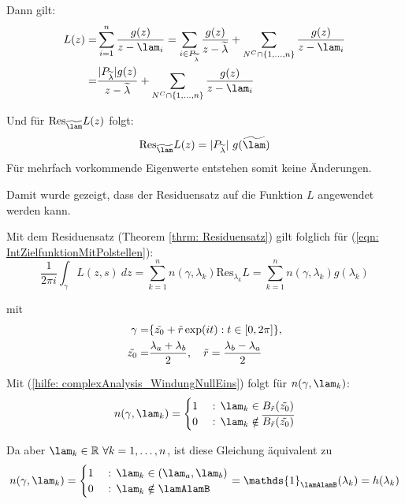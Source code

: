 \documentclass[a4paper,12pt]{report}
\newcommand{\R}{\mathbb R}
\newcommand{\1}{\mathds{1}}
\newcommand{\Res}{\text{Res}}
\theoremstyle{plain} %
\theoremstyle{definition} %
\theoremstyle{remark}
\begin{document}
\begin{itemize}
                        Dann gilt:
                        \begin{align*}
                              L(z) =& \sum_{i=1}^{n} \frac{g(z)}{z-\lam_i}
                              = \sum_{i\in P_{\widetilde \lambda}} \frac{g(z)}{z-\widetilde{\lambda}}+\sum_{N^C\cap\{1,\dots,n\}}\frac{g(z)}{z-\lam_i}\\
                              =& \frac{|P_{\widetilde \lambda}| g(z)}{z-\widetilde{\lambda}}+\sum_{N^C\cap\{1,\dots,n\}}\frac{g(z)}{z-\lam_i}
                        \end{align*}

                        Und für $\Res_{\widetilde{\lam}}L(z)$ folgt:
                        $$\Res_{\widetilde{\lam}}L(z) = |P_{\widetilde \lambda}|\ g(\widetilde{\lam})$$
                        Für mehrfach vorkommende Eigenwerte entstehen somit keine Änderungen. 
            \end{itemize}

            Damit wurde gezeigt, dass der Residuensatz auf die Funktion $L$ angewendet werden kann.

            Mit dem Residuensatz (Theorem \ref{thrm: Residuensatz}) gilt folglich für (\ref{eqn: IntZielfunktionMitPolstellen}):
            $$\frac 1 {2\pi i}\int_\gamma L(z,s)\ dz = \sum_{k=1}^{n} n(\gamma, \lambda_k) \Res_{\lambda_k}L = \sum_{k=1}^{n} n(\gamma, \lambda_k) g(\lambda_k)$$

            mit \begin{align}
                  \gamma =& \{\Tilde{z_0} + \Tilde r\exp(i t): t\in [0,2\pi]\},\label{def: gamma}\\
                  \Tilde{z_0} =& \frac {\lambda_a+\lambda_b} {2},\quad\Tilde r = \frac {\lambda_b-\lambda_a} {2}\nonumber
            \end{align}

            Mit (\ref{hilfe: complexAnalysis_WindungNullEins}) folgt für $n(\gamma, \lam_k)$:
            $$n(\gamma, \lam_k) = \begin{cases}
                  1& \text{ : }\lam_k\in B_{\Tilde{r}}(\Tilde{z_0})\\
                  0& \text{ : }\lam_k\notin\overline {B_{\Tilde{r}}(\Tilde{z_0})}
            \end{cases}$$
            
            Da aber $\lam_k\in \R\ \forall k=1,\dots,n$, ist diese Gleichung äquivalent zu
            $$n(\gamma, \lam_k) = \begin{cases}
                  1& \text{ : }\lam_k\in (\lam_a,\lam_b)\\
                  0& \text{ : }\lam_k\notin \lamAlamB
            \end{cases} = \1_{\lamAlamB}(\lambda_k) = h(\lambda_k)$$
\end{document}
